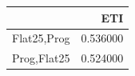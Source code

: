 \begin{tabular}{lr}
\toprule
 & ETI \\
\midrule
Flat25,Prog & 0.536000 \\
Prog,Flat25 & 0.524000 \\
\bottomrule
\end{tabular}
